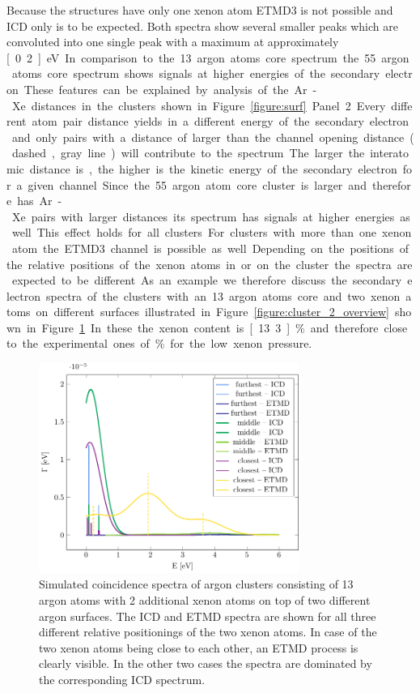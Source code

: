 Because the structures have only one xenon atom ETMD3 is not possible and
ICD only is to be expected. Both spectra show several smaller peaks which
are convoluted into one single peak with a maximum at
approximately \unit[0.2]{eV}. In comparison to the 13 argon atoms core
spectrum the 55 argon atoms core spectrum shows
signals at higher energies of the secondary electron. These features
can be explained by analysis of the Ar-Xe distances in the clusters shown
in Figure \ref{figure:surf} Panel 2. Every different atom pair distance
yields in a different energy of the secondary electron and only pairs
with a distance of larger than the channel opening distance
(dashed, gray line) will contribute
to the spectrum. The larger the interatomic distance is, the higher is the
kinetic energy of the secondary electron for a given channel.
Since the 55 argon atom core cluster is larger and therefore
has Ar-Xe pairs with larger distances its spectrum has signals at higher
energies as well.
This effect holds for all clusters.


For clusters with more than one xenon atom the ETMD3 channel is possible
as well. Depending on the positions of the relative positions of the xenon
atoms in or on the cluster the spectra are expected to be different.
As an example we therefore discuss the secondary electron spectra of the
clusters with an 13 argon atoms core and two xenon atoms on different
surfaces illustrated in Figure \ref{figure:cluster_2_overview} shown in Figure
\ref{figure:2tops}. In these the xenon content is \unit[13.3]{\%} and therefore
close to the experimental ones of \unit[10-12]{\%} for the low xenon pressure.

\begin{figure}[h]
 \centering
 \includegraphics[width=8.5cm]{pics/2tops.pdf}
 \caption{Simulated coincidence spectra of argon clusters consisting of 13
          argon atoms with 2 additional xenon atoms on top of two different
          argon surfaces. The ICD and ETMD spectra are shown for all three
          different relative positionings of the two xenon atoms. In case of
          the two xenon atoms being close to each other, an ETMD process is
          clearly visible. In the other two cases the spectra are dominated by
          the corresponding ICD spectrum.}
 \label{figure:2tops}
\end{figure}


